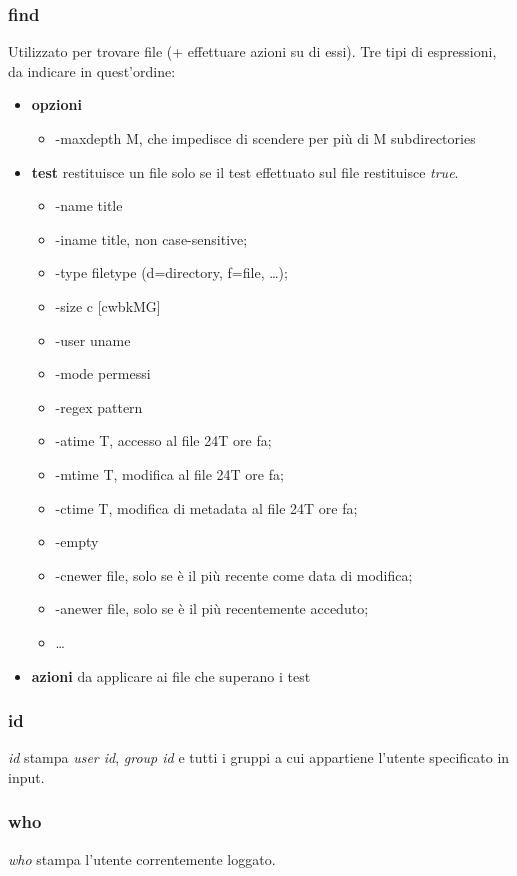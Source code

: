 \subsubsection{find}
Utilizzato per trovare file (+ effettuare azioni su di essi).
Tre tipi di espressioni, da indicare in quest'ordine:
\begin{itemize}
	\item \textbf{opzioni}
	\begin{itemize}
		\item -maxdepth M, che impedisce di scendere per più di M subdirectories
	\end{itemize}
	\item \textbf{test} restituisce un file solo se il test effettuato sul file restituisce \textit{true}.
	\begin{itemize}
		\item -name title
		\item -iname title, non case-sensitive;
		\item -type filetype (d=directory, f=file, \ldots);
		\item -size c [cwbkMG]
		\item -user uname
		\item -mode permessi
		\item -regex pattern
		\item -atime T, accesso al file 24T ore fa;
		\item -mtime T, modifica al file 24T ore fa;
		\item -ctime T, modifica di metadata al file 24T ore fa;
		\item -empty
		\item -cnewer file, solo se è il più recente come data di modifica;
		\item -anewer file, solo se è il più recentemente acceduto;
		\item \ldots
	\end{itemize}
	\item \textbf{azioni} da applicare ai file che superano i test
\end{itemize}

\subsubsection{id}
\textit{id} stampa \textit{user id}, \textit{group id} e tutti i gruppi a cui appartiene l'utente specificato in input.

\subsubsection{who}
\textit{who} stampa l'utente correntemente loggato.

